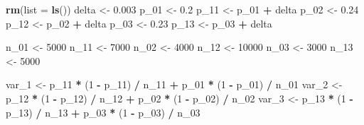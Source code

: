 \documentclass[
]{article}
\newenvironment{Shaded}{\begin{snugshade}}{\end{snugshade}}
\newcommand{\DataTypeTok}[1]{\textcolor[rgb]{0.13,0.29,0.53}{#1}}
\newcommand{\DecValTok}[1]{\textcolor[rgb]{0.00,0.00,0.81}{#1}}
\newcommand{\FloatTok}[1]{\textcolor[rgb]{0.00,0.00,0.81}{#1}}
\newcommand{\KeywordTok}[1]{\textcolor[rgb]{0.13,0.29,0.53}{\textbf{#1}}}
\newcommand{\NormalTok}[1]{#1}
\newcommand{\OperatorTok}[1]{\textcolor[rgb]{0.81,0.36,0.00}{\textbf{#1}}}
\newcommand{\StringTok}[1]{\textcolor[rgb]{0.31,0.60,0.02}{#1}}
\begin{document}
\begin{Shaded}
\begin{Highlighting}[]
\KeywordTok{rm}\NormalTok{(}\DataTypeTok{list =} \KeywordTok{ls}\NormalTok{())}
\NormalTok{delta <-}\StringTok{ }\FloatTok{0.003}
\NormalTok{p_}\DecValTok{01}\NormalTok{ <-}\StringTok{ }\FloatTok{0.2}
\NormalTok{p_}\DecValTok{11}\NormalTok{ <-}\StringTok{ }\NormalTok{p_}\DecValTok{01} \OperatorTok{+}\StringTok{ }\NormalTok{delta}
\NormalTok{p_}\DecValTok{02}\NormalTok{ <-}\StringTok{ }\FloatTok{0.24}
\NormalTok{p_}\DecValTok{12}\NormalTok{ <-}\StringTok{ }\NormalTok{p_}\DecValTok{02} \OperatorTok{+}\StringTok{ }\NormalTok{delta}
\NormalTok{p_}\DecValTok{03}\NormalTok{ <-}\StringTok{ }\FloatTok{0.23}
\NormalTok{p_}\DecValTok{13}\NormalTok{ <-}\StringTok{ }\NormalTok{p_}\DecValTok{03} \OperatorTok{+}\StringTok{ }\NormalTok{delta}

\NormalTok{n_}\DecValTok{01}\NormalTok{ <-}\StringTok{ }\DecValTok{5000}
\NormalTok{n_}\DecValTok{11}\NormalTok{ <-}\StringTok{ }\DecValTok{7000}
\NormalTok{n_}\DecValTok{02}\NormalTok{ <-}\StringTok{ }\DecValTok{4000}
\NormalTok{n_}\DecValTok{12}\NormalTok{ <-}\StringTok{ }\DecValTok{10000}
\NormalTok{n_}\DecValTok{03}\NormalTok{ <-}\StringTok{ }\DecValTok{3000}
\NormalTok{n_}\DecValTok{13}\NormalTok{ <-}\StringTok{ }\DecValTok{5000}

\NormalTok{var_}\DecValTok{1}\NormalTok{ <-}\StringTok{ }\NormalTok{p_}\DecValTok{11} \OperatorTok{*}\StringTok{ }\NormalTok{(}\DecValTok{1} \OperatorTok{-}\StringTok{ }\NormalTok{p_}\DecValTok{11}\NormalTok{) }\OperatorTok{/}\StringTok{ }\NormalTok{n_}\DecValTok{11} \OperatorTok{+}\StringTok{ }\NormalTok{p_}\DecValTok{01} \OperatorTok{*}\StringTok{ }\NormalTok{(}\DecValTok{1} \OperatorTok{-}\StringTok{ }\NormalTok{p_}\DecValTok{01}\NormalTok{) }\OperatorTok{/}\StringTok{ }\NormalTok{n_}\DecValTok{01}
\NormalTok{var_}\DecValTok{2}\NormalTok{ <-}\StringTok{ }\NormalTok{p_}\DecValTok{12} \OperatorTok{*}\StringTok{ }\NormalTok{(}\DecValTok{1} \OperatorTok{-}\StringTok{ }\NormalTok{p_}\DecValTok{12}\NormalTok{) }\OperatorTok{/}\StringTok{ }\NormalTok{n_}\DecValTok{12} \OperatorTok{+}\StringTok{ }\NormalTok{p_}\DecValTok{02} \OperatorTok{*}\StringTok{ }\NormalTok{(}\DecValTok{1} \OperatorTok{-}\StringTok{ }\NormalTok{p_}\DecValTok{02}\NormalTok{) }\OperatorTok{/}\StringTok{ }\NormalTok{n_}\DecValTok{02}
\NormalTok{var_}\DecValTok{3}\NormalTok{ <-}\StringTok{ }\NormalTok{p_}\DecValTok{13} \OperatorTok{*}\StringTok{ }\NormalTok{(}\DecValTok{1} \OperatorTok{-}\StringTok{ }\NormalTok{p_}\DecValTok{13}\NormalTok{) }\OperatorTok{/}\StringTok{ }\NormalTok{n_}\DecValTok{13} \OperatorTok{+}\StringTok{ }\NormalTok{p_}\DecValTok{03} \OperatorTok{*}\StringTok{ }\NormalTok{(}\DecValTok{1} \OperatorTok{-}\StringTok{ }\NormalTok{p_}\DecValTok{03}\NormalTok{) }\OperatorTok{/}\StringTok{ }\NormalTok{n_}\DecValTok{03}


\end{Highlighting}
\end{Shaded}
\end{document}
